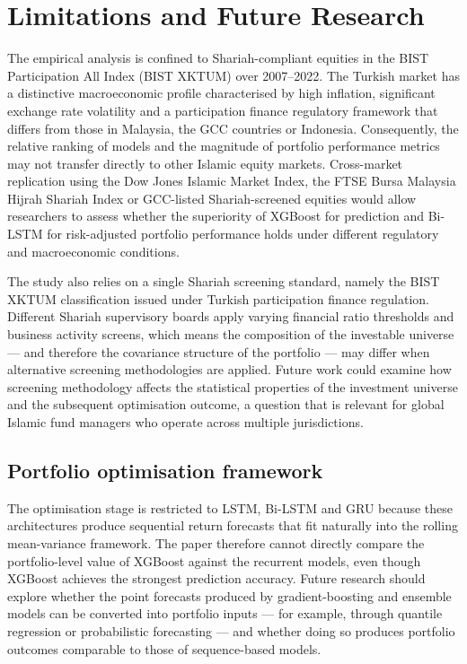\section{Limitations and Future Research}

The empirical analysis is confined to Shariah-compliant equities in the BIST
Participation All Index (BIST XKTUM) over 2007--2022. The Turkish market has
a distinctive macroeconomic profile characterised by high inflation, significant
exchange rate volatility and a participation finance regulatory framework that
differs from those in Malaysia, the GCC countries or Indonesia. Consequently,
the relative ranking of models and the magnitude of portfolio performance metrics
may not transfer directly to other Islamic equity markets. Cross-market replication
using the Dow Jones Islamic Market Index, the FTSE Bursa Malaysia Hijrah Shariah
Index or GCC-listed Shariah-screened equities would allow researchers to assess
whether the superiority of XGBoost for prediction and Bi-LSTM for risk-adjusted
portfolio performance holds under different regulatory and macroeconomic conditions.

The study also relies on a single Shariah screening standard, namely the BIST XKTUM
classification issued under Turkish participation finance regulation. Different Shariah
supervisory boards apply varying financial ratio thresholds and business activity
screens, which means the composition of the investable universe --- and therefore the
covariance structure of the portfolio --- may differ when alternative screening
methodologies are applied. Future work could examine how screening methodology
affects the statistical properties of the investment universe and the subsequent
optimisation outcome, a question that is relevant for global Islamic fund managers
who operate across multiple jurisdictions.

\subsection{Portfolio optimisation framework}

The optimisation stage is restricted to LSTM, Bi-LSTM and GRU because these
architectures produce sequential return forecasts that fit naturally into the
rolling mean-variance framework. The paper therefore cannot directly compare
the portfolio-level value of XGBoost against the recurrent models, even though
XGBoost achieves the strongest prediction accuracy. Future research should explore
whether the point forecasts produced by gradient-boosting and ensemble models can
be converted into portfolio inputs --- for example, through quantile regression or
probabilistic forecasting --- and whether doing so produces portfolio outcomes
comparable to those of sequence-based models.


